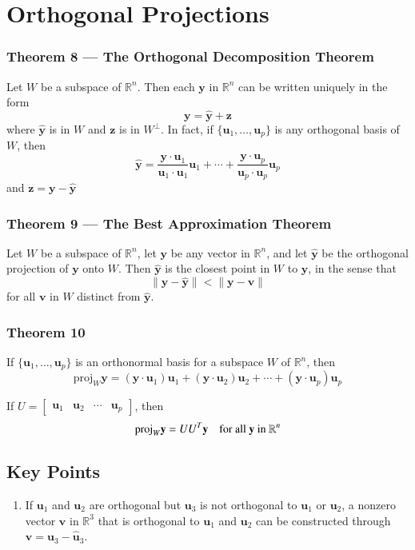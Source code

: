 \documentclass{article}
\begin{document}
\section*{Orthogonal Projections}

\subsubsection*{Theorem 8 --- The Orthogonal Decomposition Theorem}

Let $W$ be a subspace of $\mathbb{R}^n$. Then each $\mathbf{y}$ in $\mathbb{R}^n$ can be written
uniquely in the form
\[\mathbf{y}=\mathbf{\hat{y}}+\mathbf{z}\]
where $\mathbf{\hat{y}}$ is in $W$ and $\mathbf{z}$ is in $W^\perp$. In fact, if
$\{\mathbf{u}_1, \ldots, \mathbf{u}_p\}$ is any orthogonal basis of $W$, then
\[\mathbf{\hat{y}}=\frac{\mathbf{y}\cdot\mathbf{u}_1}{\mathbf{u}_1\cdot\mathbf{u}_1}\mathbf{u}_1+
\cdots+\frac{\mathbf{y}\cdot\mathbf{u}_p}{\mathbf{u}_p\cdot\mathbf{u}_p}\mathbf{u}_p\]
and $\mathbf{z}=\mathbf{y}-\mathbf{\hat{y}}$

\subsubsection*{Theorem 9 --- The Best Approximation Theorem}

Let $W$ be a subspace of $\mathbb{R}^n$, let $\mathbf{y}$ be any vector in $\mathbb{R}^n$, and let
$\mathbf{\hat{y}}$ be the orthogonal projection of $\mathbf{y}$ onto $W$. Then $\mathbf{\hat{y}}$
is the closest point in $W$ to $\mathbf{y}$, in the sense that
\[\|\mathbf{y}-\mathbf{\hat{y}}\|<\|\mathbf{y}-\mathbf{v}\|\]
for all $\mathbf{v}$ in $W$ distinct from $\mathbf{\hat{y}}$.

\subsubsection*{Theorem 10}
If $\{\mathbf{u}_1, \ldots, \mathbf{u}_p\}$ is an orthonormal basis for a subspace $W$ of
$\mathbb{R}^n$, then
\[\text{proj}_W \mathbf{y}=(\mathbf{y}\cdot\mathbf{u}_1)\mathbf{u}_1+(\mathbf{y}\cdot\mathbf{u}_2)
\mathbf{u}_2+\cdots +(\mathbf{y}\cdot\mathbf{u}_p)\mathbf{u}_p\]

If $U=\begin{bmatrix}\mathbf{u}_1 & \mathbf{u}_2 & \cdots & \mathbf{u}_p \end{bmatrix}$, then
\[\text{proj}_W\mathbf{y}=U U^T \mathbf{y}\quad\text{for all \textbf{y} in }\mathbb{R}^n\]

\subsection*{Key Points}
\begin{enumerate}
    \item If $\mathbf{u}_1$ and $\mathbf{u}_2$ are orthogonal but $\mathbf{u}_3$ is not orthogonal
    to $\mathbf{u}_1$ or $\mathbf{u}_2$, a nonzero vector $\mathbf{v}$ in $\mathbb{R}^3$ that is
    orthogonal to $\mathbf{u}_1$ and $\mathbf{u}_2$ can be constructed through
    $\mathbf{v}=\mathbf{u}_3-\mathbf{\hat{u}}_3$.
\end{enumerate}
\end{document}
